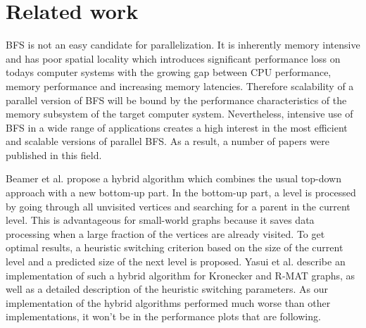 \documentclass[letterpaper]{article}
\newcommand{\mypar}[1]{{\bf #1.}} %
\begin{document}
	
	
		\section{Related work} \label{sec:rewo} %
		BFS is not an easy candidate for parallelization.
		It is inherently memory intensive and has poor spatial locality which introduces significant performance loss on todays computer systems with the growing gap between CPU performance, memory performance and increasing memory latencies.
		Therefore scalability of a parallel version of BFS will be bound by the performance characteristics of the memory subsystem of the target computer system. 
		Nevertheless, intensive use of BFS in a wide range of applications creates a high interest in the most efficient and scalable versions of parallel BFS.
		As a result, a number of papers were published in this field. 
		
		Beamer et al.\cite{beamer2011searching} propose a hybrid algorithm which combines the usual top-down approach with a new bottom-up part. 
		In the bottom-up part, a level is processed by going through all unvisited vertices and searching for a parent in the current level. 
		This is advantageous for small-world graphs because it saves data processing when a large fraction of the vertices are already visited. 
		To get optimal results, a heuristic switching criterion based on the size of the current level and a predicted size of the next level is proposed. 
		Yasui et al.\cite{6691600} describe an implementation of such a hybrid algorithm for Kronecker and R-MAT graphs, as well as a detailed description of the heuristic switching parameters.
		As our implementation of the hybrid algorithms performed much worse than other implementations, it won't be in the performance plots that are following.
	
\end{document}

